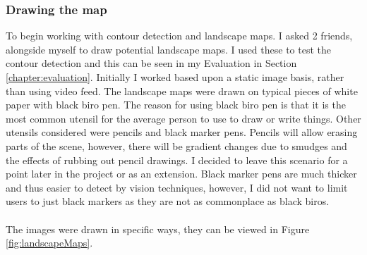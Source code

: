 \documentclass[11pt]{article}
\begin{document}
\subsubsection{Drawing the map}
To begin working with contour detection and landscape maps. 
I asked 2 friends, alongside
myself to draw potential landscape maps. I used these to test the
contour detection and this can be seen in my Evaluation in Section
\ref{chapter:evaluation}. Initially I worked based 
upon a static image basis, rather than using
video feed. The landscape maps were drawn on typical pieces of white paper with
black biro pen. The reason for using black biro pen is that it is the most
common utensil for the average person to use to draw or write things. 
Other utensils considered were pencils and black marker pens. 
Pencils will allow erasing parts of the scene, however, there will be 
gradient changes due to smudges and 
the effects of rubbing out pencil drawings. I decided to leave this 
scenario for a point later in the project or as an extension. 
Black marker pens are much thicker and thus easier
to detect by vision techniques, however, I did not want to limit users
to just black markers as they are not as commonplace as black biros.\\
\\
The images were drawn in specific ways, they can be viewed in Figure 
\ref{fig:landscapeMaps}. \\
\end{document}
